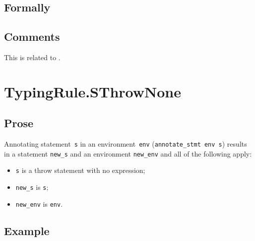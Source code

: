 \documentclass{book}
\newcommand\annotateexpr[1]{\textsf{annotate\_expr}(#1)}
\newcommand\annotatestmt[1]{\texttt{annotate\_stmt}(#1)}
\newcommand\newtenv[0]{\texttt{new\_tenv}}
\newcommand\veone[0]{\texttt{e1}}
\newcommand\vetwo[0]{\texttt{e2}}
\newcommand\vs[0]{\texttt{s}}
\newcommand\news[0]{\texttt{new\_s}}
\newcommand\dir[0]{\texttt{dir}}
\begin{document}
\begin{itemize}

\begin{emptyformal}
    \subsection{Formally}
\end{emptyformal}

\subsection{Comments}
    This is related to .


\section{TypingRule.SThrowNone \label{sec:TypingRule.SThrowNone}}

  \subsection{Prose}
Annotating statement~\texttt{s} in an environment~\texttt{env}
(\texttt{annotate\_stmt env s}) results in a statement \texttt{new\_s} and an
environment \texttt{new\_env} and all of the following apply:
   \begin{itemize}
   \item \texttt{s} is a throw statement with no expression;
   \item \texttt{new\_s} is \texttt{s};
   \item \texttt{new\_env} is \texttt{env}.
   \end{itemize}

  \subsection{Example}



\end{itemize}
\end{document}

